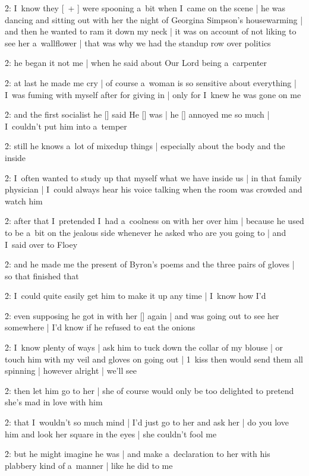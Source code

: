 \f2:
I~know they [\bloom\ + \josie] were spooning a~bit when I~came on the scene |
he was dancing and sitting out with her the night of Georgina Simpson's housewarming |
and then he wanted to ram it down my neck |
it was on account of not liking to see her a~wallflower |
that was why we had the standup row over politics

\f2:
he began it not me |
when he said about Our Lord being a~carpenter

\f2:
at last he made me cry |
of course a~woman is so sensitive about everything |
I~was fuming with myself after for giving in |
only for I~knew he was gone on me

\f2:
and the first socialist he [\bloom] said He [\ourlord] was |
he [\bloom] annoyed me so much |
I~couldn't put him into a~temper

\f2:
still he knows a~lot of mixedup things |
especially about the body and the inside

\f2:
I~often wanted to study up that myself what we have inside us |
in that family physician |
I~could always hear his voice talking when the room was crowded and watch him

\f2:
after that I~pretended I~had a~coolness on with her over him |
because he used to be a~bit on the jealous side whenever he asked who are you going to |
and I~said over to Floey

\f2:
and he made me the present of Byron's poems and the three pairs of gloves |
so that finished that

\f2:
I~could quite easily get him to make it up any time |
I~know how I'd

\f2:
even supposing he got in with her [\josie] again |
and was going out to see her somewhere |
I'd know if he refused to eat the onions

\f2:
I~know plenty of ways |
ask him to tuck down the collar of my blouse |
or touch him with my veil and gloves on going out |
1~kiss then would send them all spinning |
however alright |
we'll see

\f2:
then let him go to her |
she of course would only be too delighted to pretend she's mad in love with him

\f2:
that I~wouldn't so much mind |
I'd just go to her and ask her |
do you love him and look her square in the eyes |
she couldn't fool me

\f2:
but he might imagine he was |
and make a~declaration to her with his plabbery kind of a~manner |
like he did to me

